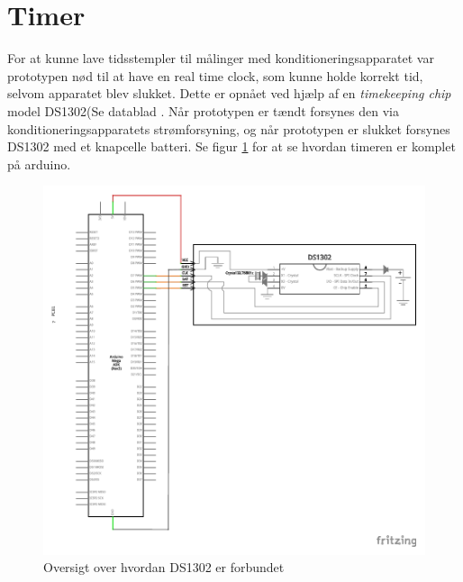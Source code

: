 \section{Timer}
For at kunne lave tidsstempler til målinger med konditioneringsapparatet var prototypen nød til at have en real time clock, som kunne holde korrekt tid, selvom apparatet blev slukket. Dette er opnået ved hjælp af en \textit{timekeeping chip} model DS1302(Se datablad . Når prototypen er tændt forsynes den via konditioneringsapparatets strømforsyning, og når prototypen er slukket forsynes DS1302 med et knapcelle batteri. Se figur \ref{fig:timerschematic} for at se hvordan timeren er komplet på arduino. 
\begin{figure}[H]
	\includegraphics[trim = 15 30 0 0, clip = true, width = \textwidth]{billeder/Timer_schem.pdf}
	\caption{Oversigt over hvordan DS1302 er forbundet}\label{fig:timerschematic}
\end{figure}

